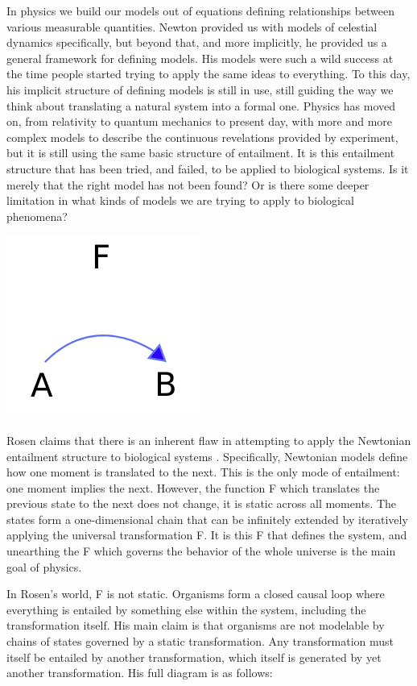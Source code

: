 \documentclass[12pt]{article}
\begin{document}
In physics we build our models out of equations defining relationships between various measurable quantities.  Newton provided us with models of celestial dynamics specifically, but beyond that, and more implicitly, he provided us a general framework for defining models.  His models were such a wild success at the time people started trying to apply the same ideas to everything.  To this day, his implicit structure of defining models is still in use, still guiding the way we think about translating a natural system into a formal one.  Physics has moved on, from relativity to quantum mechanics to present day, with more and more complex models to describe the continuous revelations provided by experiment, but it is still using the same basic structure of entailment.  It is this entailment structure that has been tried, and failed, to be applied to biological systems.  Is it merely that the right model has not been found?  Or is there some deeper limitation in what kinds of models we are trying to apply to biological phenomena?

\begin{center}
\includegraphics[scale=0.6]{newton.png}
\end{center}

Rosen claims that there is an inherent flaw in attempting to apply the Newtonian entailment structure to biological systems \cite{Rosen}.  Specifically, Newtonian models define how one moment is translated to the next.  This is the only mode of entailment: one moment implies the next.  However, the function F which translates the previous state to the next does not change, it is static across all moments.  The states form a one-dimensional chain that can be infinitely extended by iteratively applying the universal transformation F.  It is this F that defines the system, and unearthing the F which governs the behavior of the whole universe is the main goal of physics.  

In Rosen's world, F is not static.  Organisms form a closed causal loop where everything is entailed by something else within the system, including the transformation itself.  His main claim is that organisms are not modelable by chains of states governed by a static transformation.  Any transformation must itself be entailed by another transformation, which itself is generated by yet another transformation.  His full diagram is as follows:
\end{document}
